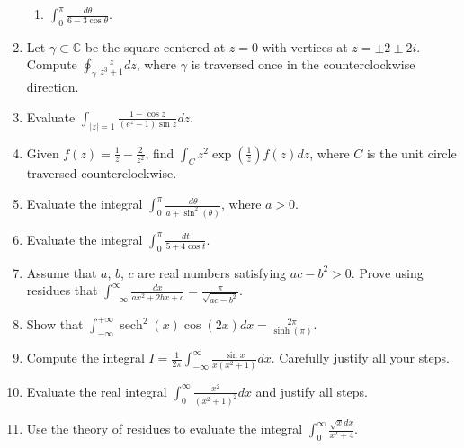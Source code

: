 \documentclass[a4paper,10pt]{article}
\begin{document}
\begin{enumerate}
\begin{enumerate}
	\item $\int_{0}^{\pi}\frac{d\theta}{6-3\cos\theta}$.
	\end{enumerate}
	
\item 
	
	Let $\gamma \subset \mathbb{C}$ be the square centered at $z = 0$ with vertices at $z = \pm 2 \pm 2i$. Compute $\oint_{\gamma}\frac{z}{z^{3}+1}dz$, where $\gamma$ is traversed once in the counterclockwise direction.
	
\item 
	
	Evaluate $\int_{|z|=1}\frac{1-\cos z}{(e^{z}-1)\sin z}dz$.
	
\item 
	
	Given $f(z) = \frac{1}{z} - \frac{2}{z^{2}}$, find $\int_{C}z^{2}\exp(\frac{1}{z})f(z)dz$, where $C$ is the unit circle traversed counterclockwise.
	
\item 
	
	Evaluate the integral $\int_{0}^{\pi}\frac{d\theta}{a+\sin^{2}(\theta)}$, where $a > 0$.
	
\item 
	
	Evaluate the integral $\int_{0}^{\pi}\frac{dt}{5+4\cos t}$.
	
\item 
	
	Assume that $a$, $b$, $c$ are real numbers satisfying $ac - b^{2} > 0$. Prove using residues that $\int_{-\infty}^{\infty}\frac{dx}{ax^{2}+2bx+c} = \frac{\pi}{\sqrt{ac-b^{2}}}$.
	
\item 
	
	Show that $\int_{-\infty}^{+\infty}\operatorname{sech}^{2}(x)\cos(2x)dx = \frac{2\pi}{\sinh(\pi)}$.
	
\item 
	
	Compute the integral $I = \frac{1}{2\pi}\int_{-\infty}^{\infty}\frac{\sin x}{x(x^{2}+1)}dx$. Carefully justify all your steps.
	
\item 
	
	Evaluate the real integral $\int_{0}^{\infty}\frac{x^{2}}{(x^{2}+1)^{2}}dx$ and justify all steps.
	
\item 
	
	Use the theory of residues to evaluate the integral $\int_{0}^{\infty}\frac{\sqrt{x}dx}{x^{2}+4}$.
	

\end{enumerate}
\end{document}
